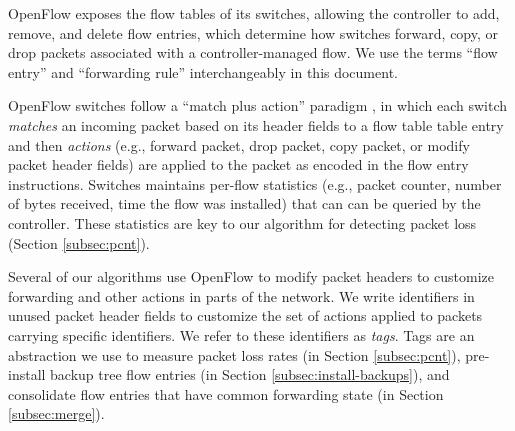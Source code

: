 OpenFlow exposes the flow tables of its switches, allowing the controller to add, remove, and delete flow entries, which determine how switches 
forward, copy, or drop packets associated with a controller-managed flow. We use the terms ``flow entry'' and ``forwarding rule'' interchangeably in this document.

OpenFlow switches follow a ``match plus action'' paradigm \cite{OpenFlow08}, in which each switch \emph{matches} an incoming packet based on its header fields
to a flow table table entry and then \emph{actions} (e.g., forward packet, drop packet, copy packet, or modify packet header fields) are applied to the packet as encoded in the flow entry instructions.  
Switches maintains per-flow statistics (e.g., packet counter, number of bytes received, time the flow was installed) that can 
can be queried by the controller.  These statistics are key to our algorithm for detecting packet loss (Section \ref{subsec:pcnt}).

Several of our algorithms use OpenFlow to modify packet headers to customize forwarding and other actions in parts of the network.  We write identifiers in unused packet
header fields to customize the set of actions applied to packets carrying specific identifiers.
We refer to these identifiers as \emph{tags}.  Tags are an abstraction we use to measure packet loss rates (\pcnt in Section \ref{subsec:pcnt}), 
pre-install backup tree flow entries (\pre in Section \ref{subsec:install-backups}), and consolidate flow entries that have common forwarding state (\merge in Section \ref{subsec:merge}).




